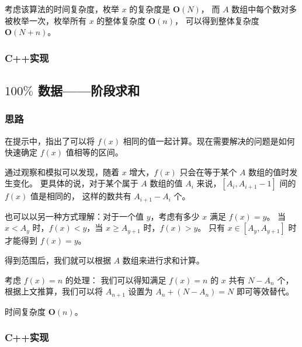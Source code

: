 考虑该算法的时间复杂度，枚举 $x$ 的复杂度是 $\mathbf{O}(N)$，
而 $A$ 数组中每个数对多被枚举一次，枚举所有 $x$ 的整体复杂度 $\mathbf{O}(n)$，
可以得到整体复杂度 $\mathbf{O}(N+n)$。

\subsubsection{C++实现}



\subsection{\texorpdfstring{$100\%$}{100\%} 数据——阶段求和}

\subsubsection{思路}

在提示中，指出了可以将 $f(x)$ 相同的值一起计算。现在需要解决的问题是如何快速确定 $f(x)$ 值相等的区间。

通过观察和模拟可以发现，随着 $x$ 增大，$f(x)$ 只会在等于某个 $A$ 数组的值时发生变化。
更具体的说，对于某个属于 $A$ 数组的值 $A_i$ 来说，$[A_i,A_{i+1}-1]$ 间的 $f(x)$ 值是相同的，
这样的数共有 $A_{i+1}-A_i$ 个。

也可以以另一种方式理解：对于一个值 $y$，考虑有多少 $x$ 满足 $f(x)=y$。
当 $x<A_y$ 时，$f(x)<y$，当 $x\ge A_{y+1}$ 时，$f(x)>y$。
只有 $x\in [A_y,A_{y+1}]$ 时才能得到 $f(x)=y$。

得到范围后，我们就可以根据 $A$ 数组来进行求和计算。

考虑 $f(x)=n$ 的处理：
我们可以得知满足 $f(x)=n$ 的 $x$ 共有 $N-A_n$ 个，
根据上文推算，我们可以将 $A_{n+1}$ 设置为 $A_n+(N-A_n)=N$ 即可等效替代。

时间复杂度 $\mathbf{O}(n)$。

\subsubsection{C++实现}


